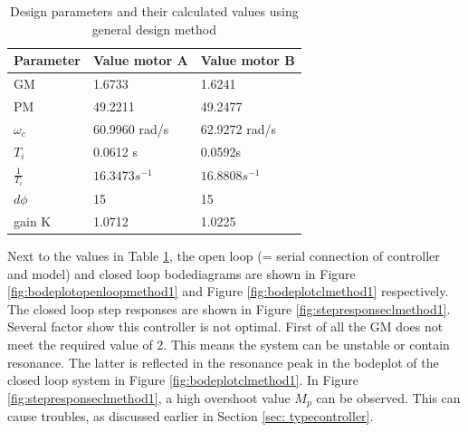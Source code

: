 \documentclass[a4paper,kul]{kulakarticle} %
\begin{document}
\begin{table}[htp!]
	
	\centering
	
	\begin{tabular}{|l|l|l|}
		\hline
		Parameter                & Value motor A & Value motor B                       \\ \hline
		GM                       & 1.6733 &        1.6241                \\
		PM                       & 49.2211\degree & 49.2477\degree \\
		$\omega_c$ & 60.9960 rad/s              &  62.9272 rad/s\\
		$T_i $                    & 0.0612 s    &     0.0592s           \\
		$\frac{1}{T_i}$                    & $16.3473 s^{-1}$  &  $16.8808s^{-1}$                  \\
		$d\phi$             & 15\degree    & 15\degree \\
		gain K 	 		& 1.0712  & 1.0225 \\  \hline
	\end{tabular}
	\caption{Design parameters and their calculated values using general design method}
	\label{tab:values}
\end{table}
Next to the values in Table \ref{tab:values}, the open loop (= serial connection of controller and model) and closed loop bodediagrams are shown in Figure \ref{fig:bodeplotopenloopmethod1} and Figure \ref{fig:bodeplotclmethod1} respectively. The closed loop step responses are shown in Figure \ref{fig:stepresponseclmethod1}. Several factor show this controller is not optimal. First of all the GM does not meet the required value of 2. This means the system can be unstable or contain resonance. The latter is reflected in the resonance peak in the bodeplot of the closed loop system in Figure \ref{fig:bodeplotclmethod1}. In Figure \ref{fig:stepresponseclmethod1}, a high overshoot value $M_p$ can be observed. This can cause troubles, as discussed earlier in Section \ref{sec: typecontroller}. 
\end{document}

